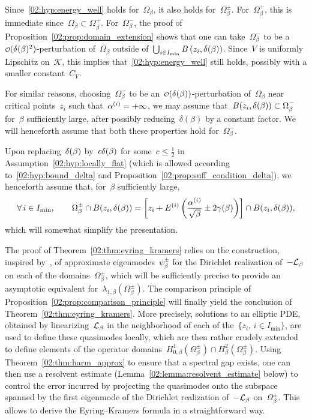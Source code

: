    \begin{remark}
    \label{02:rem:energy_well_still_holds}
    Since~\eqref{02:hyp:energy_well} holds for~$\Omega_\beta$, it also holds for~$\Omega_\beta^{\pm}$. For~$\Omega_\beta^{+}$, this is immediate since~$\Omega_\beta\subset\Omega_\beta^{+}$. For~$\Omega_\beta^{-}$, the proof of Proposition~\ref{02:prop:domain_extension} shows that one can take~$\Omega_\beta^-$ to be a~$\smallo(\largeRadius(\beta)^2)$-perturbation of~$\Omega_\beta$ outside of~$\bigcup_{i\in I_{\min}} B\left(z_i,\delta(\beta)\right)$. Since~$V$ is uniformly Lipschitz on~$\mathcal K$, this implies that~\eqref{02:hyp:energy_well} still holds, possibly with a smaller constant~$C_V$.

    For similar reasons, choosing~$\Omega_\beta^-$ to be an~$\smallo(\delta(\beta))$-perturbation of~$\Omega_\beta$ near critical points~$z_i$ such that~$\alpha^{(i)}=+\infty$, we may assume that~$B(z_i,\delta(\beta))\subset\Omega_\beta^-$ for~$\beta$ sufficiently large, after possibly reducing~$\delta(\beta)$ by a constant factor.
    We will henceforth assume that both these properties hold for~$\Omega_\beta^-$.
    \end{remark}

    Upon replacing~$\delta(\beta)$ by~$c\delta(\beta)$ for some~$c\leq\frac12$ in Assumption~\eqref{02:hyp:locally_flat} (which is allowed according to~\eqref{02:hyp:bound_delta} and Proposition~\ref{02:prop:suff_condition_delta}), we henceforth assume that, for~$\beta$ sufficiently large,
    \begin{equation}
        \label{02:eq:perturbed_domain_shape}
        \forall\,i\in I_{\min},\qquad\Omega_\beta^\pm\cap B(z_i,\delta(\beta)) = \left[z_i + E^{(i)}\left(\frac{\alpha^{(i)}}{\sqrt\beta}\pm 2\gamma(\beta)\right)\right]\cap B(z_i,\delta(\beta)),
    \end{equation}
    which will somewhat simplify the presentation.

    The proof of Theorem~\ref{02:thm:eyring_kramers} relies on the construction, inspired by~\cite{BGK05,LPM20,LPN21}, of approximate eigenmodes~$\psi_\beta^{\pm}$ for the Dirichlet realization of~$-\mathcal{L}_\beta$ on each of the domains~$\Omega_\beta^\pm$, which will be sufficiently precise to provide an asymptotic equivalent for~$\lambda_{1,\beta}\left(\Omega_\beta^{\pm}\right)$. The comparison principle of Proposition~\ref{02:prop:comparison_principle} will finally yield the conclusion of Theorem~\ref{02:thm:eyring_kramers}. 
    More precisely, solutions to an elliptic PDE, obtained by linearizing~$\mathcal{L}_\beta$ in the neighborhood of each of the~$\{z_i,\,i\in I_{\min}\}$, are used to define these quasimodes locally, which are then rather crudely extended to define elements of the operator domains~$H_{0,\beta}^1(\Omega_\beta^{\pm})\cap H_\beta^2(\Omega_\beta^\pm)$.
    Using Theorem~\ref{02:thm:harm_approx} to ensure that a spectral gap exists, one can then use a resolvent estimate (Lemma~\ref{02:lemma:resolvent_estimate} below) to control the error incurred by projecting the quasimodes onto the subspace spanned by the first eigenmode of the Dirichlet realization of~$-\mathcal{L}_\beta$ on~$\Omega_\beta^{\pm}$. This allows to derive the Eyring--Kramers formula in a straightforward way.
    
